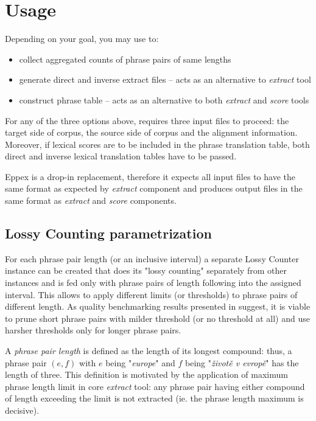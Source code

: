 
\chapter{Usage}
\label{chap:usage}

Depending on your goal, you may use \eppex{} to:
\begin{itemize}
 \item collect aggregated counts of phrase pairs of same lengths
 \item generate direct and inverse extract files -- acts as an alternative to \emph{extract} tool
 \item construct phrase table -- acts as an alternative to both \emph{extract} and \emph{score} tools
\end{itemize}

For any of the three options above, \eppex{} requires three input files to proceed:
the target side of corpus, the source side of corpus and the alignment information.
Moreover, if lexical scores are to be included in the phrase translation table,
both direct and inverse lexical translation tables have to be passed.

Eppex is a drop-in replacement, therefore it expects all input files to have the same
format as expected by \emph{extract} component and produces output files in the same
format as \emph{extract} and \emph{score} components.

\section{Lossy Counting parametrization}

For each phrase pair length (or an inclusive interval) a separate Lossy Counter
instance can be created that does its "lossy counting" separately from other instances
and is fed only with phrase pairs of length following into the assigned interval.
This allows to apply different limits (or thresholds) to phrase pairs of different length.
As quality benchmarking results presented in  suggest, it is viable
to prune short phrase pairs with milder threshold (or no threshold at all) and use harsher
thresholds only for longer phrase pairs.

A \emph{phrase pair length} is defined as the length of its longest compound:
thus, a phrase pair $(e,f)$ with $e$ being "\emph{europe}" and $f$ being
"\emph{životě v evropě}" has the length of three.
This definition is motivated by the application of maximum phrase length limit
in core \emph{extract} tool: any phrase pair having either compound of length
exceeding the limit is not extracted (ie. the phrase length maximum is decisive).

